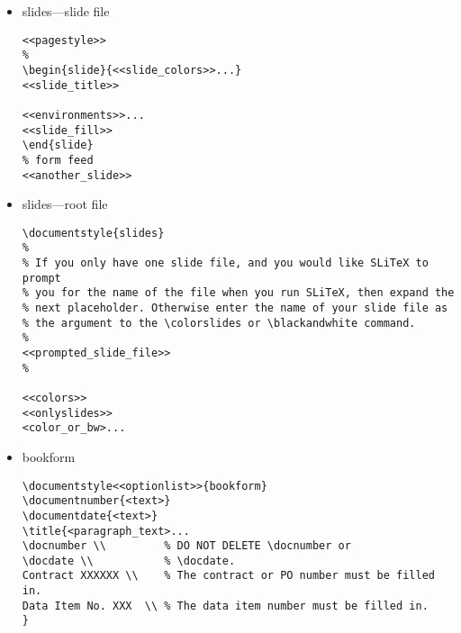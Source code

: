 \begin{itemize}
\begin{small}
\begin{verbatim}
<<environments>>...

\closing{<paragraph_text>...}
<<cc>>
<<encl>>
<<ps>>
\end{letter}

\end{verbatim}
\end{small}

\item slides---slide file

\begin{small}
\begin{verbatim}
<<pagestyle>>
%
\begin{slide}{<<slide_colors>>...}
<<slide_title>>
 
<<environments>>...
<<slide_fill>>
\end{slide}
% form feed
<<another_slide>>
\end{verbatim}
\end{small}

\item slides---root file

\begin{small}
\begin{verbatim}
\documentstyle{slides}
%
% If you only have one slide file, and you would like SLiTeX to prompt
% you for the name of the file when you run SLiTeX, then expand the
% next placeholder. Otherwise enter the name of your slide file as
% the argument to the \colorslides or \blackandwhite command.
%
<<prompted_slide_file>>
%

<<colors>>
<<onlyslides>>
<color_or_bw>...

\end{verbatim}
\end{small}

\newpage

\item bookform

\begin{small}
\begin{verbatim}
\documentstyle<<optionlist>>{bookform}
\documentnumber{<text>}
\documentdate{<text>}
\title{<paragraph_text>...
\docnumber \\         % DO NOT DELETE \docnumber or
\docdate \\           % \docdate.
Contract XXXXXX \\    % The contract or PO number must be filled in.
Data Item No. XXX  \\ % The data item number must be filled in.
}




\end{verbatim}
\end{small}
\end{itemize}
